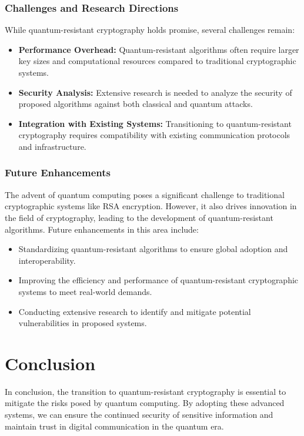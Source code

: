 \documentclass[12pt,a4paper]{report}
\begin{document}
\subsection{Challenges and Research Directions}
While quantum-resistant cryptography holds promise, several challenges remain:
\begin{itemize}
    \item \textbf{Performance Overhead:} Quantum-resistant algorithms often require larger key sizes and computational resources compared to traditional cryptographic systems.
    \item \textbf{Security Analysis:} Extensive research is needed to analyze the security of proposed algorithms against both classical and quantum attacks.
    \item \textbf{Integration with Existing Systems:} Transitioning to quantum-resistant cryptography requires compatibility with existing communication protocols and infrastructure.
\end{itemize}

\subsection{Future Enhancements}
The advent of quantum computing poses a significant challenge to traditional cryptographic systems like RSA encryption. However, it also drives innovation in the field of cryptography, leading to the development of quantum-resistant algorithms. Future enhancements in this area include:
\begin{itemize}
    \item Standardizing quantum-resistant algorithms to ensure global adoption and interoperability.
    \item Improving the efficiency and performance of quantum-resistant cryptographic systems to meet real-world demands.
    \item Conducting extensive research to identify and mitigate potential vulnerabilities in proposed systems.
\end{itemize}


\chapter{Conclusion}
In conclusion, the transition to quantum-resistant cryptography is essential to mitigate the risks posed by quantum computing. By adopting these advanced systems, we can ensure the continued security of sensitive information and maintain trust in digital communication in the quantum era.
\end{document}
